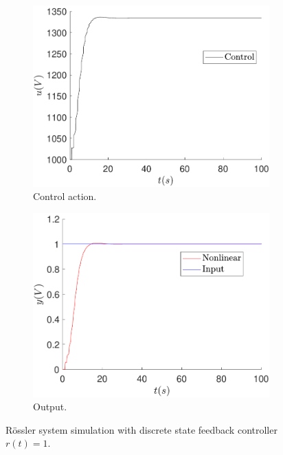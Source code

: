 	\begin{figure}
        \centering
        \begin{subfigure}[b]{0.475\textwidth}
            \centering
            \includegraphics[scale=0.425]{files/feedback/Ref!0/control_sfc_u_1_ref_dif_0.pdf}
            \caption{Control action.}
        \end{subfigure}
        \vskip0.1cm
        \begin{subfigure}[b]{0.475\textwidth}   
            \centering 
            \includegraphics[scale=0.425]{files/feedback/Ref!0/sfc_u_1_ref_dif_0.pdf}
            \caption{Output.}
        \end{subfigure}
        \caption{Rössler system simulation with discrete state feedback controller $r(t)=1$.}
        \label{fig:feedback_u_1}
	\end{figure}
	
